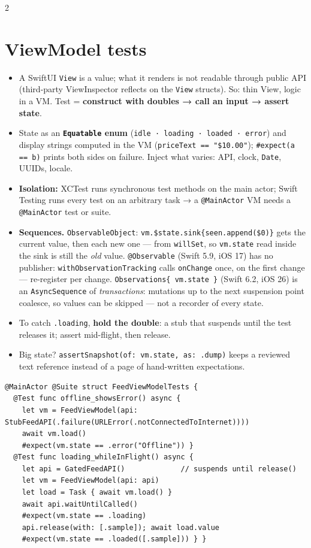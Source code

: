 \documentclass[8pt]{extarticle}
\newcommand\ct[1]{\texttt{#1}}
\begin{document}
\begin{multicols}{2}
\raggedright
\footnotesize{}

\section{ViewModel tests}
\begin{itemize}\raggedright
  \item A SwiftUI \ct{View} is a value; what it renders is not readable through public API (third-party
        ViewInspector reflects on the \ct{View} structs). So: thin View, logic in a VM. Test =
        \textbf{construct with doubles → call an input → assert state}.
  \item State as an \textbf{\ct{Equatable} enum} (\ct{idle · loading · loaded · error}) and display
        strings computed in the VM (\ct{priceText == "\$10.00"}); \ct{\#expect(a == b)} prints both
        sides on failure. Inject what varies: API, clock, \ct{Date}, UUIDs, locale.
  \item \textbf{Isolation:} XCTest runs synchronous test methods on the main actor; Swift Testing runs
        every test on an arbitrary task → a \ct{@MainActor} VM needs a \ct{@MainActor} test or suite.
  \item \textbf{Sequences.} \ct{ObservableObject}: \ct{vm.\$state.sink\{seen.append(\$0)\}} gets the current
        value, then each new one — from \ct{willSet}, so \ct{vm.state} read inside the sink is still
        the \emph{old} value. \ct{@Observable} (Swift 5.9, iOS 17) has no publisher:
        \ct{withObservationTracking} calls \ct{onChange} once, on the first change — re-register per
        change. \ct{Observations\{ vm.state \}} (Swift 6.2, iOS 26) is an \ct{AsyncSequence} of
        \emph{transactions}: mutations up to the next suspension point coalesce, so values can be
        skipped — not a recorder of every state.
  \item To catch \ct{.loading}, \textbf{hold the double}: a stub that suspends until the test
        releases it; assert mid-flight, then release.
  \item Big state? \ct{assertSnapshot(of: vm.state, as: .dump)} keeps a reviewed text reference
        instead of a page of hand-written expectations.
\end{itemize}
\begin{lstlisting}[language=SwiftSheet]
@MainActor @Suite struct FeedViewModelTests {
  @Test func offline_showsError() async {
    let vm = FeedViewModel(api: StubFeedAPI(.failure(URLError(.notConnectedToInternet))))
    await vm.load()
    #expect(vm.state == .error("Offline")) }
  @Test func loading_whileInFlight() async {
    let api = GatedFeedAPI()             // suspends until release()
    let vm = FeedViewModel(api: api)
    let load = Task { await vm.load() }
    await api.waitUntilCalled()
    #expect(vm.state == .loading)
    api.release(with: [.sample]); await load.value
    #expect(vm.state == .loaded([.sample])) } }
\end{lstlisting}


\end{multicols}
\end{document}
